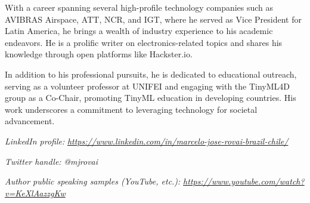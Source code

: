 \documentclass[
  letterpaper,
  DIV=11,
  numbers=noendperiod]{scrreprt}
\begin{document}
With a career spanning several high-profile technology companies such as
AVIBRAS Airspace, ATT, NCR, and IGT, where he served as Vice President
for Latin America, he brings a wealth of industry experience to his
academic endeavors. He is a prolific writer on electronics-related
topics and shares his knowledge through open platforms like Hackster.io.

In addition to his professional pursuits, he is dedicated to educational
outreach, serving as a volunteer professor at UNIFEI and engaging with
the TinyML4D group as a Co-Chair, promoting TinyML education in
developing countries. His work underscores a commitment to leveraging
technology for societal advancement.

\emph{LinkedIn profile:}
\href{https://www.linkedin.com/in/marcelo-jose-rovai-brazil-chile/}{\emph{https://www.linkedin.com/in/marcelo-jose-rovai-brazil-chile/}}

\emph{Twitter handle:} \emph{@mjrovai}

\emph{Author public speaking samples (YouTube, etc.):}
\href{https://www.youtube.com/watch?v=KeXlAazzgKw}{\emph{https://www.youtube.com/watch?v=KeXlAazzgKw}}
\end{document}
